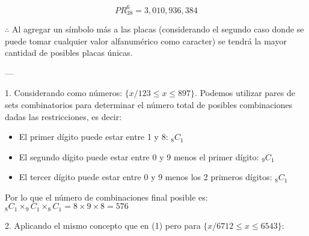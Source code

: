 \documentclass{article}
\begin{document}
$$PR^{6}_{38} = 3,010,936,384$$

$\therefore$ Al agregar un símbolo más a las placas (considerando el segundo caso donde se puede tomar cualquier valor alfanumérico como caracter) se tendrá la mayor cantidad de posibles placas únicas.

---

\bigskip


1. Considerando como números: $\{x / 123 \leq x \leq 897\}$. Podemos utilizar pares de sets combinatorios para determinar el número total de posibles combinaciones dadas las restricciones, es decir:

\begin{itemize}
    \item El primer dígito puede estar entre 1 y 8: $_8C_1$
    \item El segundo dígito puede estar entre 0 y 9 menos el primer dígito: $_9C_1$
    \item El tercer dígito puede estar entre 0 y 9 menos los 2 primeros dígitos: $_8C_1$
\end{itemize}

Por lo que el número de combinaciones final posible es: $_8C_1 \times _9C_1 \times _8C_1 = 8 \times 9 \times 8 = 576$

\bigskip

2. Aplicando el mismo concepto que en (1) pero para $\{x / 6712 \leq x \leq 6543 \}$:






















\medskip
\end{document}
